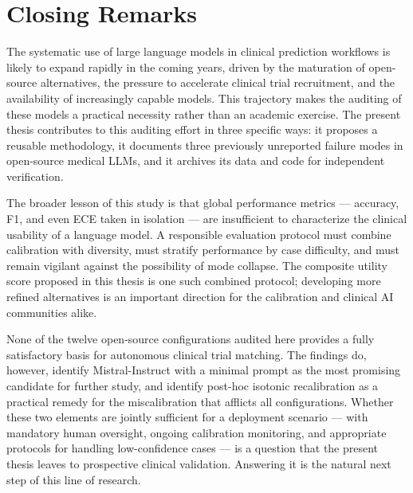 \section{Closing Remarks}
\label{sec:conc-closing}

The systematic use of large language models in clinical prediction 
workflows is likely to expand rapidly in the coming years, driven by 
the maturation of open-source alternatives, the pressure to accelerate 
clinical trial recruitment, and the availability of increasingly 
capable models. This trajectory makes the auditing of these models a 
practical necessity rather than an academic exercise. The present 
thesis contributes to this auditing effort in three specific ways: it 
proposes a reusable methodology, it documents three previously 
unreported failure modes in open-source medical LLMs, and it archives 
its data and code for independent verification.

The broader lesson of this study is that global performance metrics 
--- accuracy, F1, and even ECE taken in isolation --- are insufficient 
to characterize the clinical usability of a language model. A 
responsible evaluation protocol must combine calibration with 
diversity, must stratify performance by case difficulty, and must 
remain vigilant against the possibility of mode collapse. The 
composite utility score proposed in this thesis is one such combined 
protocol; developing more refined alternatives is an important 
direction for the calibration and clinical AI communities alike.

None of the twelve open-source configurations audited here provides a 
fully satisfactory basis for autonomous clinical trial matching. The 
findings do, however, identify Mistral-Instruct with a minimal prompt 
as the most promising candidate for further study, and identify 
post-hoc isotonic recalibration as a practical remedy for the 
miscalibration that afflicts all configurations. Whether these two 
elements are jointly sufficient for a deployment scenario --- with 
mandatory human oversight, ongoing calibration monitoring, and 
appropriate protocols for handling low-confidence cases --- is a 
question that the present thesis leaves to prospective clinical 
validation. Answering it is the natural next step of this line of 
research.